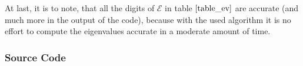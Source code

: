 \documentclass[12pt, a4paper]{article}
\newenvironment{code}{\captionsetup{type=listing}}{}
\begin{document}
  \noindent
  At last, it is to note, that all the digits of $\mathcal{E}$ in table $\ref{table_ev}$ are accurate (and much more in the output of the code), because with the used algorithm it is no effort to compute the eigenvalues accurate in a moderate amount of time.

  \subsubsection*{Source Code}
  
  \begin{code}
    \inputminted{python}{numerov.py}
  \end{code}
  \begin{code}
  	\inputminted{python}{problem1.py}
  \end{code}
  \begin{code}
    \inputminted{python}{problem2a.py}
  \end{code}
  \begin{code}
    \inputminted{python}{problem2b.py}
  \end{code}
\end{document}
